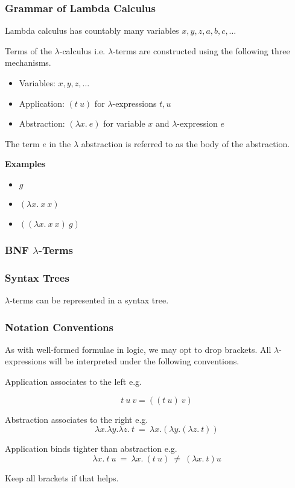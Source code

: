 \documentclass{beamer}
\begin{document}
\begin{frame}
	\frametitle{Grammar of Lambda Calculus}


	Lambda calculus has countably many variables $x,y,z,a,b,c,\dots$

	Terms of the $\lambda$-calculus i.e. $\lambda$-terms are constructed using the following three mechanisms.

	\begin{itemize}
		\item[] Variables: $x,y,z, \dots$
		\item[] Application: $(t \ u)$ for $\lambda$-expressions $t,u$
		\item[] Abstraction: $(\lambda x. \ e)$ for variable $x$ and $\lambda$-expression $e$
	\end{itemize}

	The term $e$ in the $\lambda$ abstraction is referred to as the body of the abstraction. 

	{\bf Examples}
	
	\begin{itemize}
		\item[] $g$
		
		\item[] $(\lambda x. \ x \ x)$

		\item[] $((\lambda x. \ x \ x) \ g)$
	\end{itemize}

\end{frame}

\begin{frame}
	\frametitle{BNF $\lambda$-Terms}

\end{frame}

\begin{frame}
	\frametitle{Syntax Trees}

	$\lambda$-terms can be represented in a syntax tree. 

	\vspace{70mm}

\end{frame}

\begin{frame}
	\frametitle{Notation Conventions}

	As with well-formed formulae in logic, we may opt to drop brackets. All $\lambda$-expressions will be interpreted under the following conventions.

	Application associates to the left e.g. 
	
	$$t \ u \ v = ((t \ u) \ v)$$

	Abstraction associates to the right e.g. $$\lambda x. \lambda y. \lambda z. \ t \ = \ \lambda x. (\lambda y. (\lambda z. \ t))$$

	Application binds tighter than abstraction e.g. $$\lambda x. \ t \ u \ = \ \lambda x. \ (t \ u) \ \neq \ (\lambda x. \ t) u $$

	Keep all brackets if that helps.  
	
\end{frame}
\end{document}
